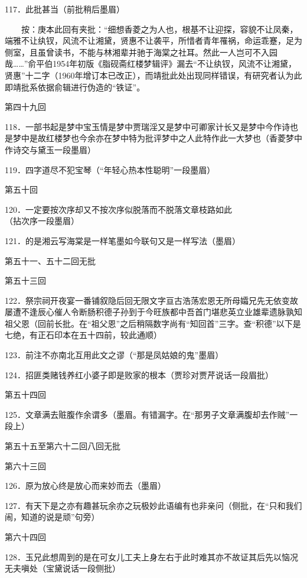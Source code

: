 117．此批甚当{（\kaishu 前批稍后墨眉）}

{　　\href{../Text/part0087.html\#navto_1_a}{}按：庚本此回有夹批：“细想香菱之为人也，根基不让迎探，容貌不让凤秦，端雅不让纨钗，风流不让湘黛，贤惠不让袭平，所惜者青年罹祸，命运乖蹇，足为侧室，且虽曾读书，不能与林湘辈并驰于海棠之社耳。然此一人岂可不入园哉\ldots{}\ldots{}”俞平伯1954年初版《脂砚斋红楼梦辑评》漏去“不让纨钗，风流不让湘黛，贤惠”十二字（1960年增订本已改正），而靖批此处出现同样错误，有研究者认为此即靖批系依据俞辑进行伪造的“铁证”。}

\href{../Text/part0087.html\#navto_t_a}{}

第四十九回

118．一部书起是梦中宝玉情是梦中贾瑞淫又是梦中可卿家计长又是梦中今作诗也是梦中是故红楼梦也今余亦在梦中特为批评梦中之人此特作此一大梦也{（\kaishu 香菱梦中作诗交与黛玉一段墨眉）}

119．四字道尽不犯宝琴{（\kaishu “年轻心热本性聪明”一段墨眉）}

第五十回

120．一定要按次序却又不按次序似脱落而不脱落文章枝路如此{（\kaishu 拈次序一段墨眉）}

121．的是湘云写海棠是一样笔墨如今联句又是一样写法{（\kaishu 墨眉）}

第五十一、五十二回无批

第五十三回

122．祭宗祠开夜宴一番铺叙隐后回无限文字亘古浩荡宏恩无所母孀兄先无依变故屡遭不逢辰心催人令断肠积德子孙到于今旺族都中吾首门堪悲英立业雄辈遗脉孰知祖父恩{（\kaishu 回前长批。在“祖父恩”之后稍隔数字尚有“知回首”三字。查“积德”以下是七绝，有正石印本在五十四前，较此通顺）}

123．前注不亦南北互用此文之谬{（\kaishu “那是凤姑娘的鬼”墨眉）}

124．招匪类赌钱养红小婆子即是败家的根本{（\kaishu 贾珍对贾芹说话一段眉批）}

第五十四回

125．文章满去赃腹作余谓多{（\kaishu 墨眉。有错漏字。在“那男子文章满腹却去作贼”一段上）}

第五十五至第六十二回八回无批

第六十三回

126．原为放心终是放心而来妙而去{（\kaishu 墨眉）}

127．有天下是之亦有趣甚玩余亦之玩极妙此语编有也非亲问{（\kaishu 侧批，在“只和我们闹，知道的说是顽”句旁）}

第六十四回

128．玉兄此想周到的是在可女儿工夫上身左右于此时难其亦不故证其后先以恼况无夫嗔处{（\kaishu 宝黛说话一段侧批）}

